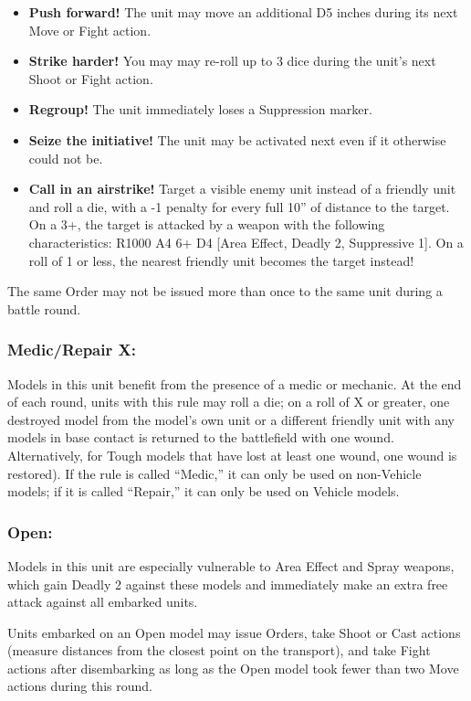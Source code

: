 \begin{multicols}{2}
\begin{itemize}
    \item \textbf{Push forward!} The unit may move an additional D5 inches during its next Move or Fight action.
    \item \textbf{Strike harder!} You may may re-roll up to 3 dice during the unit's next Shoot or Fight action.
    \item \textbf{Regroup!} The unit immediately loses a Suppression marker.
    \item \textbf{Seize the initiative!} The unit may be activated next even if it otherwise could not be.
    \item \textbf{Call in an airstrike!} Target a visible enemy unit instead of a friendly unit and roll a die, with a -1 penalty for every full 10'' of distance to the target. On a 3+, the target is attacked by a weapon with the following characteristics: R1000 A4 6+ D4 [Area Effect, Deadly 2, Suppressive 1]. On a roll of 1 or less, the nearest friendly unit becomes the target instead!
\end{itemize}

The same Order may not be issued more than once to the same unit during a battle round.

\subsubsection*{Medic/Repair X:} Models in this unit benefit from the presence of a medic or mechanic. At the end of each round, units with this rule may roll a die; on a roll of X or greater, one destroyed model from the model's own unit or a different friendly unit with any models in base contact is returned to the battlefield with one wound. Alternatively, for Tough models that have lost at least one wound, one wound is restored). If the rule is called ``Medic,'' it can only be used on non-Vehicle models; if it is called ``Repair,'' it can only be used on Vehicle models.

\subsubsection*{Open:} Models in this unit are especially vulnerable to Area Effect and Spray weapons, which gain Deadly 2 against these models and immediately make an extra free attack against all embarked units.

Units embarked on an Open model may issue Orders, take Shoot or Cast actions (measure distances from the closest point on the transport), and take Fight actions after disembarking as long as the Open model took fewer than two Move actions during this round.


\end{multicols}

